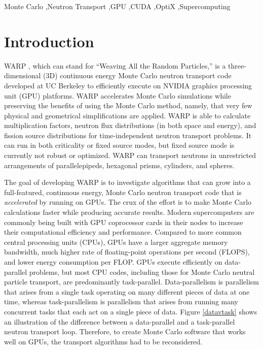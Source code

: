 \documentclass[preprint,12pt]{elsarticle}
\begin{document}
\begin{frontmatter}
\begin{abstract}
\end{abstract}

\begin{keyword}
Monte Carlo \sep Neutron Transport \sep GPU \sep CUDA \sep OptiX \sep Supercomputing


\end{keyword}

\end{frontmatter}

\linenumbers


\section{Introduction}
\label{sec:intro}

WARP \cite{algorithms}, which can stand for ``Weaving All the Random Particles,'' is a three-dimensional (3D) continuous energy Monte Carlo neutron transport code developed at UC Berkeley to efficiently execute on NVIDIA graphics processing unit (GPU) platforms.  WARP accelerates Monte Carlo simulations while preserving the benefits of using the Monte Carlo method, namely, that very few physical and geometrical simplifications are applied.  WARP is able to calculate multiplication factors, neutron flux distributions (in both space and energy), and fission source distributions for time-independent neutron transport problems.  It can run in both criticality or fixed source modes, but fixed source mode is currently not robust or optimized.  WARP can transport neutrons in unrestricted arrangements of parallelepipeds, hexagonal prisms, cylinders, and spheres.

The goal of developing WARP is to investigate algorithms that can grow into a full-featured, continuous energy, Monte Carlo neutron transport code that is \emph{accelerated} by running on GPUs.  The crux of the effort is to make Monte Carlo calculations faster while producing accurate results.  Modern supercomputers are commonly being built with GPU coprocessor cards in their nodes to increase their computational efficiency and performance.  Compared to more common central processing units (CPUs), GPUs have a larger aggregate memory bandwidth, much higher rate of floating-point operations per second (FLOPS), and lower energy consumption per FLOP.  GPUs execute efficiently on data-parallel problems, but most CPU codes, including those for Monte Carlo neutral particle transport, are predominantly task-parallel.  Data-parallelism is parallelism that arises from a single task operating on many different pieces of data at one time, whereas task-parallelism is parallelism that arises from running many concurrent tasks that each act on a single piece of data.  Figure \ref{datavtask} shows an illustration of the difference between a data-parallel and a task-parallel neutron transport loop.  Therefore, to create Monte Carlo software that works well on GPUs, the transport algorithms had to be reconsidered. 
\end{document}
